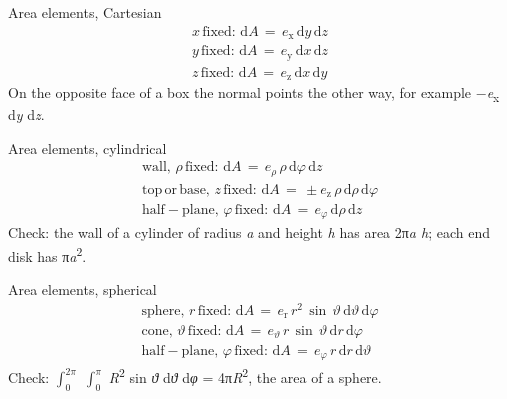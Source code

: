 \documentclass[11pt]{article}
\begin{document}
\begin{keepsection}
\begin{equationcard}{Area elements, Cartesian}
\[ \begin{gathered} {x}\, \text{fixed}:\, \mathrm{d}{A}\, =\, {e}_{\mathrm{x}}\, \mathrm{d}{y}\, \mathrm{d}{z} \\ {y}\, \text{fixed}:\, \mathrm{d}{A}\, =\, {e}_{\mathrm{y}}\, \mathrm{d}{x}\, \mathrm{d}{z} \\ {z}\, \text{fixed}:\, \mathrm{d}{A}\, =\, {e}_{\mathrm{z}}\, \mathrm{d}{x}\, \mathrm{d}{y} \end{gathered} \]
{\small On the opposite face of a box the normal points the other way, for example \ensuremath{-}\textit{e}\textsubscript{x} d\textit{y} d\textit{z}.}
\end{equationcard}

\begin{equationcard}{Area elements, cylindrical}
\[ \begin{gathered} \text{wall},\, {ρ}\, \text{fixed}:\, \mathrm{d}{A}\, =\, {e}_{ρ}\, {ρ}\, \mathrm{d}{φ}\, \mathrm{d}{z} \\ \text{top}\, \text{or}\, \text{base},\, {z}\, \text{fixed}:\, \mathrm{d}{A}\, =\, \pm {e}_{\mathrm{z}}\, {ρ}\, \mathrm{d}{ρ}\, \mathrm{d}{φ} \\ \text{half}-\text{plane},\, {φ}\, \text{fixed}:\, \mathrm{d}{A}\, =\, {e}_{φ}\, \mathrm{d}{ρ}\, \mathrm{d}{z} \end{gathered} \]
{\small Check: the wall of a cylinder of radius \textit{a} and height \textit{h} has area 2π\textit{a h}; each end disk has π\textit{a}\textsuperscript{2}.}
\end{equationcard}

\begin{equationcard}{Area elements, spherical}
\[ \begin{gathered} \text{sphere},\, {r}\, \text{fixed}:\, \mathrm{d}{A}\, =\, {e}_{\mathrm{r}}\, {r}^{2}\, \sin \, {ϑ}\, \mathrm{d}{ϑ}\, \mathrm{d}{φ} \\ \text{cone},\, {ϑ}\, \text{fixed}:\, \mathrm{d}{A}\, =\, {e}_{ϑ}\, {r}\, \sin \, {ϑ}\, \mathrm{d}{r}\, \mathrm{d}{φ} \\ \text{half}-\text{plane},\, {φ}\, \text{fixed}:\, \mathrm{d}{A}\, =\, {e}_{φ}\, {r}\, \mathrm{d}{r}\, \mathrm{d}{ϑ} \end{gathered} \]
{\small Check: $\int_{0}^{2π} $ $\int_{0}^{π} $ \textit{R}\textsuperscript{2} sin \textit{ϑ} d\textit{ϑ} d\textit{φ} = 4π\textit{R}\textsuperscript{2}, the area of a sphere.}
\end{equationcard}
\end{keepsection}
\end{document}
